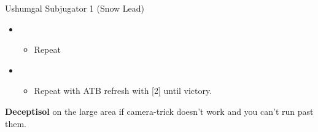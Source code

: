 \begin{multicols}{2}
\begin{battle}[1:23]{Ushumgal Subjugator 1 (Snow Lead)}
\begin{itemize}
\begin{itemize}
              \item Potion, use when Ushumgal Subjugator uses Tail Hammer
              \item Repeat
              \item \stagger
            \end{itemize}
      \item \sixth
            \begin{itemize}
              \item Repeat
            \end{itemize}
      \item \first
            \begin{itemize}
              \item Repeat with ATB refresh with [2] until victory.
            \end{itemize}
    \end{itemize}
  \end{battle}
  \textbf{Deceptisol} on the large area if camera-trick doesn't work and you can't run past them.

  \vfill
\end{multicols}
\renewcommand{\first}{[1] Ravager (\rav)}
\renewcommand{\second}{[2] Medic (\med)}
\renewcommand{\third}{[3] Synergist (\syn)}
\newpage
